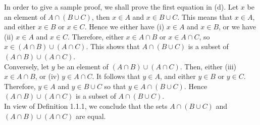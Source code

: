 In order to give a sample proof, we shall prove the first equation in (d).
Let $x$ be an element of $A\cap (B\cup C)$, then $x\in A$ and $x\in
B\cup C$.  This means that $x\in A$, and either $x\in B$ or $x\in C$.
Hence we either have (i) $x\in A$ and $x\in B$, or we have (ii) $x\in A$ and
$x\in C$. Therefore, either $x\in A\cap B$ or $x\in A\cap C$, so $x\in
(A\cap B) \cup (A\cap C)$.  This shows that $A\cap (B\cup C)$ is a
subset of $(A\cap
B)\cup (A\cap C)$.\\

Conversely, let $y$ be an element of $(A\cap B)\cup (A\cap C)$. Then,
either (iii) $x\in A\cap B$, or (iv) $y\in A\cap C$.  It follows that
$y\in A$, and either $y\in B$ or $y\in C$. Therefore, $y\in A$ and $y\in
B\cup C$ so that $y\in A \cap (B\cup C)$. Hence $(A\cap B) \cup
(A\cap C)$ is a subset of
$A\cap (B\cup C)$.\\

In view of Definition 1.1.1, we conclude that the sets $A\cap (B\cup C)$
and $(A \cap B) \cup (A\cap C)$ are equal.  
